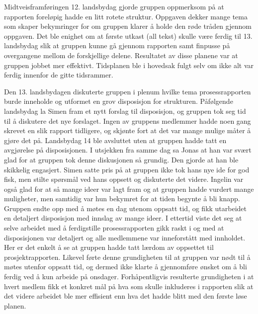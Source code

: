 Midtveisframføringen 12. landsbydag gjorde gruppen oppmerksom på at rapporten foreløpig hadde en litt rotete struktur.
Oppgaven dekker mange tema som skaper bekymringer for om gruppen klarer å holde den røde tråden gjennom oppgaven.
Det ble enighet om at første utkast (all tekst) skulle være ferdig til 13. landsbydag slik at gruppen kunne gå gjennom rapporten samt finpusse på overgangene mellom de forskjellige delene.
Resultatet av disse planene var at gruppen jobbet mer effektivt.
Tidsplanen ble i hovedsak fulgt selv om ikke alt var ferdig innenfor de gitte tidsrammer. 

Den 13. landsbydagen diskuterte gruppen i plenum hvilke tema prosessrapporten burde inneholde og utformet en grov disposisjon for strukturen.
Påfølgende landsbydag la Simen fram et nytt forslag til disposisjon, og gruppen tok seg tid til å diskutere det nye forslaget.
Ingen av gruppens medlemmer hadde noen gang skrevet en slik rapport tidligere, og skjønte fort at det var mange mulige måter å gjøre det på.
Landsbydag 14 ble avsluttet uten at gruppen hadde tatt en avgjørelse på disposisjonen.
I utsjekken fra samme dag sa Jonas at han var svært glad for at gruppen tok denne diskusjonen så grundig.
Den gjorde at han ble skikkelig engasjert.
Simen satte pris på at gruppen ikke tok hans nye ide for god fisk, men stilte spørsmål ved hans oppsett og diskuterte det videre.
Ingelin var også glad for at så mange ideer var lagt fram og at gruppen hadde vurdert mange muligheter, men samtidig var hun bekymret for at tiden begynte å bli knapp.
Gruppen endte opp med å møtes en dag utenom oppsatt tid, og fikk utarbeidet en detaljert disposisjon med innslag av mange ideer.
I ettertid viste det seg at selve arbeidet med å ferdigstille prosessrapporten gikk raskt i og med at disposisjonen var detaljert og alle medlemmene var inneforstått med innholdet.
Her er det enkelt å se at gruppen hadde tatt lærdom av oppsettet til prosjektrapporten.
Likevel førte denne grundigheten til at gruppen var nødt til å møtes utenfor oppsatt tid, og dermed ikke klarte å gjennomføre ønsket om å bli ferdig ved å kun arbeide på onsdager.
Forhåpentligvis resulterte grundigheten i at hvert medlem fikk et konkret mål på hva som skulle inkluderes i rapporten slik at det videre arbeidet ble mer effisient enn hva det hadde blitt med den første løse planen. 
